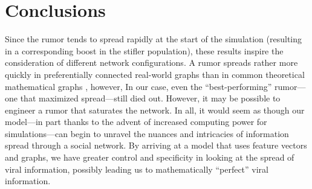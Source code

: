 \section{Conclusions}
\label{sec:conclusions}
Since the rumor tends to spread rapidly at the start of the simulation (resulting in a corresponding boost in the stifler population), these results inspire the consideration of different network configurations.
A rumor spreads rather more quickly in preferentially connected real-world graphs than in common theoretical mathematical graphs \cite{doerr-2012}, however, In our case, even the ``best-performing'' rumor---one that maximized spread---still died out.
However, it may be possible to engineer a rumor that saturates the network.
In all, it would seem as though our model---in part thanks to the advent of increased computing power for simulations---can begin to unravel the nuances and intricacies of information spread through a social network.
By arriving at a model that uses feature vectors and graphs, we have greater control and specificity in looking at the spread of viral information, possibly leading us to mathematically ``perfect'' viral information.
